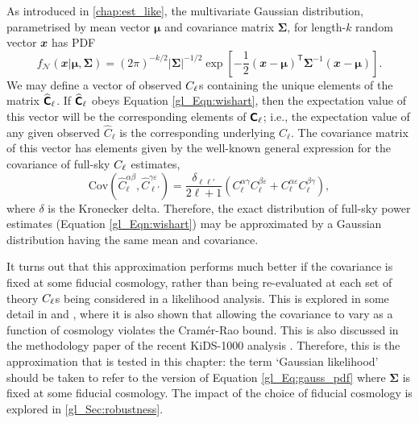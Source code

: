 As introduced in \autoref{chap:est_like}, the multivariate Gaussian distribution, parametrised by mean vector $\bm{\mu}$ and covariance matrix $\bm{\Sigma}$, for length-$k$ random vector $\mathbfit{x}$ has PDF
\begin{equation}
f_\mathcal{N} \left( \mathbfit{x} | \bm{\mu}, \bm{\Sigma} \right)
= \left( 2 \pi \right)^{- k / 2}
| \bm{\Sigma} |^{-1/2}
\exp \left[ - \frac{1}{2} \left( \mathbfit{x} - \bm{\mu} \right)^\mathsf{T}
\bm{\Sigma}^{-1} \left( \mathbfit{x} - \bm{\mu} \right) \right].
\label{gl_Eq:gauss_pdf}
\end{equation}
We may define a vector of observed $C_\ell$s containing the unique elements of the matrix $\widehat{\bm{\mathsf{C}}}_\ell$. If $\widehat{\bm{\mathsf{C}}}_\ell$ obeys Equation \eqref{gl_Eqn:wishart}, then the expectation value of this vector will be the corresponding elements of $\bm{\mathsf{C}}_\ell$; i.e., the expectation value of any given observed $\widehat{C}_\ell$ is the corresponding underlying $C_\ell$. The covariance matrix of this vector has elements given by the well-known general expression for the covariance of full-sky $C_\ell$ estimates,
\begin{equation}
\text{Cov} \left(
\widehat{C}_\ell^{\alpha \beta},
\widehat{C}_{\ell'}^{\gamma \varepsilon}
\right)
= \frac{\delta_{\ell \ell'}}{2 \ell + 1} \left(
C_\ell^{\alpha \gamma} C_\ell^{\beta \varepsilon}
+ C_\ell^{\alpha \varepsilon} C_\ell^{\beta \gamma} \right),
\label{gl_Eqn:cov_g}
\end{equation}
where $\delta$ is the Kronecker delta. Therefore, the exact distribution of full-sky power estimates (Equation \ref{gl_Eqn:wishart}) may be approximated by a Gaussian distribution having the same mean and covariance.

It turns out that this approximation performs much better if the covariance is fixed at some fiducial cosmology, rather than being re-evaluated at each set of theory $C_\ell$s being considered in a likelihood analysis. This is explored in some detail in \citet{Hamimeche2008} and \citet{Carron2013},
where it is also shown that allowing the covariance to vary as a function of cosmology violates the Cram\'er-Rao bound. This is also discussed in the methodology paper of the recent KiDS-1000 analysis \citep{Joachimi2021}. Therefore, this is the approximation that is tested in this chapter: the term `Gaussian likelihood' should be taken to refer to the version of Equation \eqref{gl_Eq:gauss_pdf} where $\bm{\Sigma}$ is fixed at some fiducial cosmology. The impact of the choice of fiducial cosmology is explored in \autoref{gl_Sec:robustness}.

